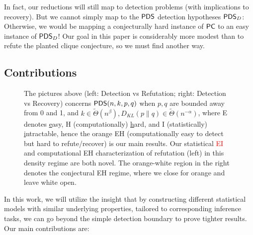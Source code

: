 \documentclass[final,12pt]{colt2023} %
\newcommand\1[1]{\mathbb{I}_{\left\{#1\right\}}}
\begin{document}
In fact, our reductions will still map to detection problems (with implications to recovery). But we cannot simply map to the $\mathsf{PDS}$ detection hypotheses $\mathsf{PDS}_D$: Otherwise, we would be mapping a conjecturally hard instance of $\mathsf{PC}$ to an easy instance of $\mathsf{PDS}_D$! Our goal in this paper is considerably more modest than to refute the planted clique conjecture, so we must find another way. 


 \subsection{Contributions}
\begin{figure}[t]
    \centering
    
    \caption{\footnotesize The pictures above (left: Detection vs Refutation; right: Detection vs Recovery) concerns $\mathsf{PDS}(n, k, p, q)$ when $p, q$ are bounded away from 0 and 1, and $k\in\tilde\Theta(n^{\beta}), D_{KL}(p\|q)\in\tilde\Theta(n^{-\alpha})$, where E denotes \underline{e}asy, H (computationally) \underline{h}ard, and I (statistically) \underline{i}ntractable, hence the orange \textcolor{amber(sae/ece)}{EH} (computationally easy to detect but hard to refute/recover) is our main results. Our statistical \textcolor{red}{EI} and computational \textcolor{amber(sae/ece)}{EH}  characterization of refutation (left) in this density regime are both novel. The orange-white region in the right denotes the conjectural \textcolor{amber(sae/ece)}{EH} regime, where we close for orange and leave white open.\vspace{-5mm}}
    \label{fig: summary}
\end{figure}
In this work, we will utilize the insight that by constructing different statistical models with similar underlying properties, tailored to corresponding inference tasks, we can go beyond the simple detection boundary to prove tighter results. Our main %
contributions are:
\end{document}
